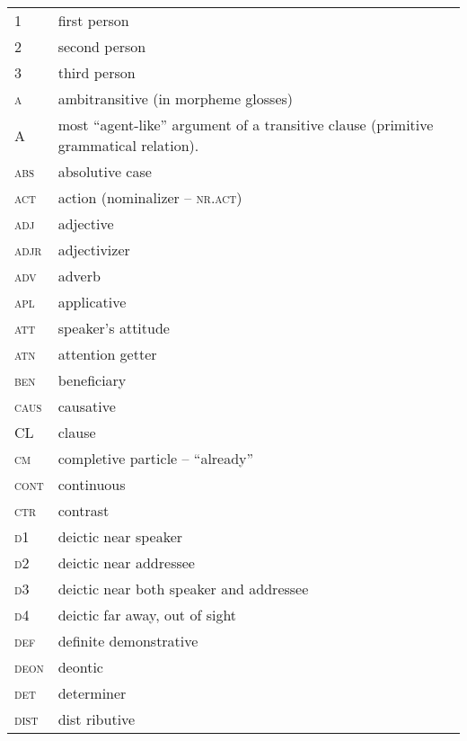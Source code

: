 \addchap{\lsAbbreviationsTitle}

\begin{tabularx} {.45\textwidth}{>{\scshape}lQ}
1       & first person \\
2       & second person \\
3       & third person \\
a       & ambitransitive (in morpheme glosses) \\
A       & most “agent-like” argument of a transitive clause (primitive grammatical relation).  \\
abs       & absolutive case \\
act       & action (nominalizer -- \textsc{nr.act})\\
adj       & adjective \\
adjr       & adjectivizer \\
adv       & adverb \\
apl       & applicative \\
att       & speaker’s attitude \\
atn       & attention getter \\
ben       & beneficiary \\
caus       & causative \\
CL      & clause \\
cm       & completive particle -- “already” \\
cont       & continuous \\
ctr       & contrast \\
d1       & deictic near speaker \\
d2       & deictic near addressee \\
d3       & deictic near both speaker and addressee \\
d4       & deictic far away, out of sight \\
def       & definite demonstrative \\
deon       & deontic \\
det       & determiner \\
dist       & dist   ributive  \\
\end{tabularx}
